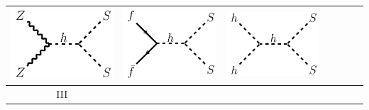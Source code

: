 \begin{table}[t!]
\begin{tabular}{|c|cccccc|}
  \includegraphics[scale=0.32]{figures/feynman_diagrams/zzssfeynman.pdf} &
  \includegraphics[scale=0.32]{figures/feynman_diagrams/ffssfeynman.pdf} &
  \includegraphics[scale=0.32]{figures/feynman_diagrams/hhssfeynman_s-channel.pdf} & \\
  \hline
  III & 

\end{tabular}
\end{table}
